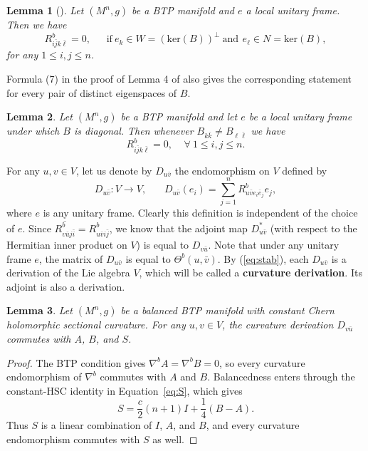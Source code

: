 \documentclass{amsart}
\newtheorem{lemma}{Lemma}
\begin{document}
\begin{lemma}[\cite{WZ}] \label{lemma-kernelB}
Let $(M^n,g)$ be a BTP manifold and $e$ a local unitary frame. Then we have
\begin{equation} \label{eq:kernelB}
 R^b_{i\bar{j}k\bar{\ell}} = 0,  \ \ \ \ \ \ \ \mbox{if} \ e_k\in W=(\mbox{ker}(B))^{\perp} \  \mbox{and} \ \,e_{\ell} \in N=\mbox{ker}(B),
\end{equation}
for any $1\leq i,j\leq n$.
\end{lemma}

Formula (7) in the proof of Lemma 4 of \cite{WZ} also gives the
corresponding statement for every pair of distinct eigenspaces of $B$.

 \begin{lemma} \label{lemma-BRb}
Let $(M^n,g)$ be a BTP manifold and  let  $e$   be  a local unitary frame under which $B$ is diagonal. Then whenever $B_{k\bar{k}} \neq B_{\ell \bar{\ell}}$ we have
\begin{equation*}  \label{eq:BRb}
R^b_{i\bar{j}k\bar{\ell}}=0, \ \ \ \ \ \forall \ 1\leq i,j\leq n.
\end{equation*}
\end{lemma}

 For any $u,v\in V$, let us denote by $D_{u\bar{v}}$ the endomorphism on $V$ defined by
$$D_{u\bar{v}}: V \rightarrow V, \ \ \ \ \ \ \ \ D_{u\bar{v}}(e_i) = \sum_{j=1}^n R^b_{u\bar{v}e_i\overline{e}_j} e_j,$$
where $e$ is any unitary frame. Clearly this definition is independent of the choice of $e$. Since $\overline{R^b_{v\bar{u}j\bar{i}} } = R^b_{u\bar{v}i\bar{j}} $, we know that the adjoint map $D_{u\bar{v}}^{\ast}$ (with respect to the Hermitian inner product on $V$) is equal to $D_{v\bar{u}}$. Note that under any unitary frame $e$, the matrix of $D_{u\bar{v}}$ is equal to $\Theta^b(u,\bar{v})$. By (\ref{eq:stab}), each $D_{u\bar{v}}$ is a derivation of the Lie algebra $V$, which will be called a {\bf  curvature derivation}. Its adjoint is also a derivation.

\begin{lemma} \label{lemma-DABS}
Let $(M^n,g)$ be a   balanced BTP manifold with constant Chern
holomorphic sectional curvature. For any $u,v\in V$, the curvature
derivation $D_{v\bar{u}}$ commutes with $A$, $B$, and $S$.
\end{lemma}

\begin{proof}
The BTP condition gives $\nabla^bA=\nabla^bB=0$, so every curvature
endomorphism of $\nabla^b$ commutes with $A$ and $B$. Balancedness enters
through the constant-HSC identity in Equation~\eqref{eq:S}, which gives
\[
 S=\frac{c}{2}(n+1)I+\frac14(B-A).
\]
Thus $S$ is a linear combination of $I$, $A$, and $B$, and every curvature
endomorphism commutes with $S$ as well.
\end{proof}
\end{document}
